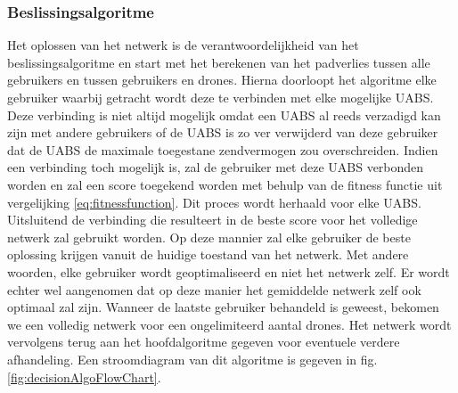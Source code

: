 \documentclass[twocolumn]{phdsymp_dutch}
\begin{document}
\subsubsection{Beslissingsalgoritme}

Het oplossen van het netwerk is de verantwoordelijkheid van het beslissingsalgoritme en start met het berekenen van het padverlies tussen 
alle gebruikers en tussen gebruikers en drones. Hierna doorloopt het algoritme elke gebruiker waarbij getracht wordt deze te verbinden 
met elke mogelijke \gls{UABS}. Deze verbinding is niet altijd mogelijk omdat een \gls{UABS} al reeds verzadigd kan zijn met andere gebruikers of 
de \gls{UABS} is zo ver verwijderd van deze gebruiker dat de \gls{UABS} de maximale toegestane zendvermogen zou overschreiden.
Indien een verbinding toch mogelijk is, zal de gebruiker met deze \gls{UABS} verbonden worden en zal een score toegekend worden met behulp van 
de fitness functie uit vergelijking \ref{eq:fitnessfunction}. 
Dit proces wordt herhaald voor elke \gls{UABS}. Uitsluitend de verbinding die resulteert in de beste score voor het volledige netwerk 
zal gebruikt worden. 
Op deze mannier zal elke gebruiker de beste oplossing krijgen vanuit de huidige toestand van het netwerk.
Met andere woorden, elke gebruiker wordt geoptimaliseerd en niet het netwerk zelf. Er wordt echter wel aangenomen dat 
op deze manier het gemiddelde netwerk zelf ook optimaal zal zijn.
Wanneer de laatste gebruiker behandeld is geweest, bekomen we een volledig netwerk voor een ongelimiteerd aantal drones.
Het netwerk wordt vervolgens terug aan het hoofdalgoritme gegeven voor eventuele verdere afhandeling.
Een stroomdiagram van dit algoritme is gegeven in fig. \ref{fig:decisionAlgoFlowChart}.
\end{document}
